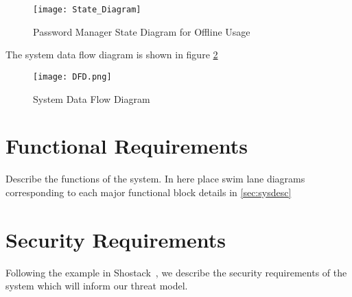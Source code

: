 \begin{figure}[h]
    \centering
    \texttt{[image: State\_Diagram]}
    \caption{Password Manager State Diagram for Offline Usage}
    \label{fig:state_diagram}
\end{figure}
The system data flow diagram is shown in figure \ref{fig:dfd}
\begin{figure}
    \centering
    \texttt{[image: DFD.png]}
    \caption{System Data Flow Diagram}
    \label{fig:dfd}
\end{figure}

\section{Functional Requirements}
\label{sec:funcreq}
Describe the functions of the system.  In here place swim lane
diagrams corresponding to each major functional block details in
\ref{sec:sysdesc}

\section{Security Requirements}
\label{sec:secreqs}
Following the example in Shostack~\cite{shostackbook}, we describe the
security requirements of the system which will inform our threat
model.

